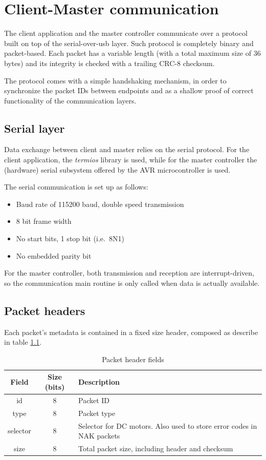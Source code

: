 \documentclass[binding=0.6cm,Lau]{sapthesis}
\begin{document}
\chapter{Client-Master communication}
\label{ch:client-master-comm}
The client application and the master controller communicate over a protocol
built on top of the serial-over-usb layer. Such protocol is completely binary
and packet-based. Each packet has a variable length (with a total maximum size
of 36 bytes) and its integrity is checked with a trailing CRC-8 checksum.

The protocol comes with a simple handshaking mechanism, in order to synchronize
the packet IDs between endpoints and as a shallow proof of correct
functionality of the communication layers.

\section{Serial layer}
Data exchange between client and master relies on the serial protocol. For the
client application, the \emph{termios} library is used, while for the master
controller the (hardware) serial subsystem offered by the AVR
microcontroller\cite{at2560-ref} is used.

The serial communication is set up as follows:
\begin{itemize}
  \item Baud rate of 115200 baud, double speed transmission
  \item 8 bit frame width
  \item No start bits, 1 stop bit (i.e.\ 8N1)
  \item No embedded parity bit
\end{itemize}

For the master controller, both transmission and reception are
interrupt-driven, so the communication main routine is only called when data is
actually available.

\section{Packet headers}
Each packet's metadata is contained in a fixed size header, composed as
describe in table \ref{tab:packet-header}.

\begin{table}[bh]
  \begin{tabularx}{\textwidth}{c c X}
    \toprule
    Field & Size (bits) & Description \\
    \midrule
    id       & $8$ & Packet ID \\
    type     & $8$ & Packet type \\
    selector & $8$ & Selector for DC motors. Also used to store error codes in NAK packets \\
    size     & $8$ & Total packet size, including header and checksum \\
    \bottomrule
  \end{tabularx}
  \caption{Packet header fields}
  \label{tab:packet-header}
\end{table}
\end{document}
